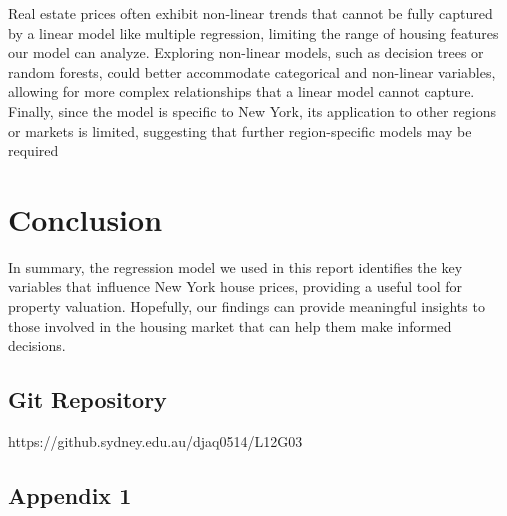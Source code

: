 \documentclass[
  twocolumn]{article}
\begin{document}
Real estate prices often exhibit non-linear trends that cannot be fully
captured by a linear model like multiple regression, limiting the range
of housing features our model can analyze. Exploring non-linear models,
such as decision trees or random forests, could better accommodate
categorical and non-linear variables, allowing for more complex
relationships that a linear model cannot capture. Finally, since the
model is specific to New York, its application to other regions or
markets is limited, suggesting that further region-specific models may
be required

\section{Conclusion}\label{conclusion}

In summary, the regression model we used in this report identifies the
key variables that influence New York house prices, providing a useful
tool for property valuation. Hopefully, our findings can provide
meaningful insights to those involved in the housing market that can
help them make informed decisions.

\subsection{Git Repository}\label{git-repository}

https://github.sydney.edu.au/djaq0514/L12G03

\newpage

\subsection{Appendix 1}\label{appendix-1}
\end{document}
